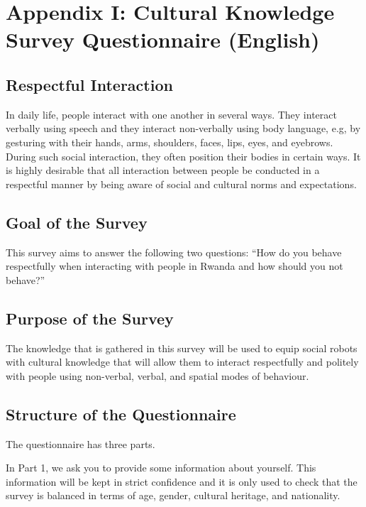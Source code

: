 \documentclass{CSSRforAfrica}
\begin{document}
\newpage

\section*{Appendix I: Cultural Knowledge  Survey  Questionnaire  (English)}
 
\subsection*{Respectful Interaction}
In daily life, people interact with one another in several ways. They interact verbally using speech and they interact non-verbally using body language, e.g, by gesturing with their hands, arms, shoulders, faces, lips, eyes, and eyebrows.  During such social interaction, they often position their bodies in certain ways.  It is highly desirable that all interaction between people be conducted in a respectful manner by being aware of social and cultural norms and expectations. 

\subsection*{Goal of the Survey}
This survey aims to answer the following two questions: ``How do you behave respectfully  when interacting with people in Rwanda and how should you not behave?''   

\subsection*{Purpose of the Survey}
The knowledge that is gathered in this survey will be used to equip social robots with cultural knowledge that will allow them to interact respectfully and politely with people  using non-verbal,  verbal, and spatial modes of behaviour.

\subsection*{Structure of the Questionnaire}
The questionnaire has three parts. 

In Part 1, we ask you to provide some information about yourself.  This information will be kept in strict confidence and it is only used to check that the survey is balanced in terms of age, gender, cultural heritage, and nationality. 
\end{document}
